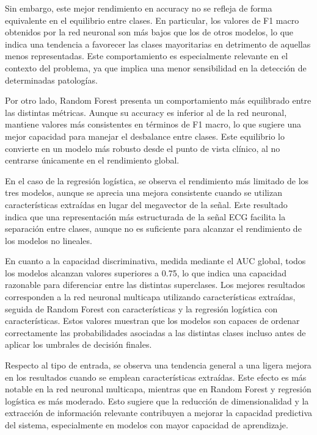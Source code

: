\documentclass[12pt,a4paper,twoside]{book}
\begin{document}
Sin embargo, este mejor rendimiento en accuracy no se refleja de forma equivalente en el equilibrio entre clases. 
En particular, los valores de F1 macro obtenidos por la red neuronal son más bajos que los de otros modelos, lo que indica una tendencia a favorecer las clases mayoritarias en detrimento de aquellas menos representadas. 
Este comportamiento es especialmente relevante en el contexto del problema, ya que implica una menor sensibilidad en la detección de determinadas patologías.

Por otro lado, Random Forest presenta un comportamiento más equilibrado entre las distintas métricas. 
Aunque su accuracy es inferior al de la red neuronal, mantiene valores más consistentes en términos de F1 macro, lo que sugiere una mejor capacidad para manejar el desbalance entre clases. 
Este equilibrio lo convierte en un modelo más robusto desde el punto de vista clínico, al no centrarse únicamente en el rendimiento global.

En el caso de la regresión logística, se observa el rendimiento más limitado de los tres modelos, aunque se aprecia una mejora consistente cuando se utilizan características extraídas en lugar del megavector de la señal. 
Este resultado indica que una representación más estructurada de la señal ECG facilita la separación entre clases, aunque no es suficiente para alcanzar el rendimiento de los modelos no lineales.

En cuanto a la capacidad discriminativa, medida mediante el AUC global, todos los modelos alcanzan valores superiores a 0.75, lo que indica una capacidad razonable para diferenciar entre las distintas superclases. 
Los mejores resultados corresponden a la red neuronal multicapa utilizando características extraídas, seguida de Random Forest con características y la regresión logística con características. 
Estos valores muestran que los modelos son capaces de ordenar correctamente las probabilidades asociadas a las distintas clases incluso antes de aplicar los umbrales de decisión finales.

Respecto al tipo de entrada, se observa una tendencia general a una ligera mejora en los resultados cuando se emplean características extraídas. 
Este efecto es más notable en la red neuronal multicapa, mientras que en Random Forest y regresión logística es más moderado. 
Esto sugiere que la reducción de dimensionalidad y la extracción de información relevante contribuyen a mejorar la capacidad predictiva del sistema, especialmente en modelos con mayor capacidad de aprendizaje.
\end{document}
